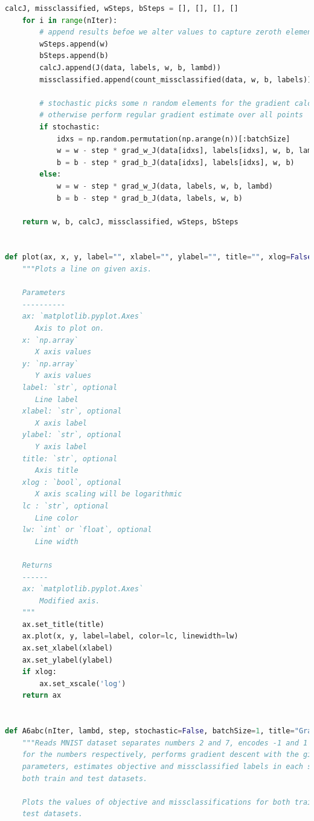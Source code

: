 \documentclass{article}
\newcommand{\1}{\mathbf{1}}
\begin{document}
\begin{lstlisting}[language=Python]
    calcJ, missclassified, wSteps, bSteps = [], [], [], []
    for i in range(nIter):
        # append results befoe we alter values to capture zeroth element correctly
        wSteps.append(w)
        bSteps.append(b)
        calcJ.append(J(data, labels, w, b, lambd))
        missclassified.append(count_missclassified(data, w, b, labels))

        # stochastic picks some n random elements for the gradient calculation.
        # otherwise perform regular gradient estimate over all points
        if stochastic:
            idxs = np.random.permutation(np.arange(n))[:batchSize]
            w = w - step * grad_w_J(data[idxs], labels[idxs], w, b, lambd)
            b = b - step * grad_b_J(data[idxs], labels[idxs], w, b)
        else:
            w = w - step * grad_w_J(data, labels, w, b, lambd)
            b = b - step * grad_b_J(data, labels, w, b)

    return w, b, calcJ, missclassified, wSteps, bSteps


def plot(ax, x, y, label="", xlabel="", ylabel="", title="", xlog=False, lc='black', lw=1):
    """Plots a line on given axis.

    Parameters
    ----------
    ax: `matplotlib.pyplot.Axes`
       Axis to plot on.
    x: `np.array`
       X axis values
    y: `np.array`
       Y axis values
    label: `str`, optional
       Line label
    xlabel: `str`, optional
       X axis label
    ylabel: `str`, optional
       Y axis label
    title: `str`, optional
       Axis title
    xlog : `bool`, optional
       X axis scaling will be logarithmic
    lc : `str`, optional
       Line color
    lw: `int` or `float`, optional
       Line width

    Returns
    ------
    ax: `matplotlib.pyplot.Axes`
        Modified axis.
    """
    ax.set_title(title)
    ax.plot(x, y, label=label, color=lc, linewidth=lw)
    ax.set_xlabel(xlabel)
    ax.set_ylabel(ylabel)
    if xlog:
        ax.set_xscale('log')
    return ax


def A6abc(nIter, lambd, step, stochastic=False, batchSize=1, title="Gradient Descent"):
    """Reads MNIST dataset separates numbers 2 and 7, encodes -1 and 1 labels
    for the numbers respectively, performs gradient descent with the given
    parameters, estimates objective and missclassified labels in each step for
    both train and test datasets.

    Plots the values of objective and missclassifications for both train and
    test datasets.


\end{lstlisting}
\end{document}
